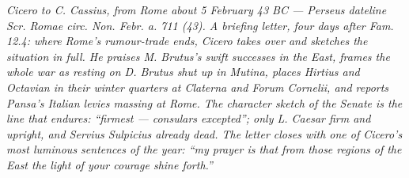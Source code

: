 
\textit{Cicero to C. Cassius, from Rome about 5 February 43 BC ---
Perseus dateline \textit{Scr. Romae circ. Non. Febr. a. 711 (43)}.
A briefing letter, four days after \emph{Fam.} 12.4: where Rome's
rumour-trade ends, Cicero takes over and sketches the situation in
full. He praises M. Brutus's swift successes in the East, frames the
whole war as resting on D. Brutus shut up in Mutina, places Hirtius
and Octavian in their winter quarters at Claterna and Forum Cornelii,
and reports Pansa's Italian levies massing at Rome. The character
sketch of the Senate is the line that endures: ``firmest --- consulars
excepted''; only L. Caesar firm and upright, and Servius Sulpicius
already dead. The letter closes with one of Cicero's most luminous
sentences of the year: ``my prayer is that from those regions of the
East the light of your courage shine forth.''}
